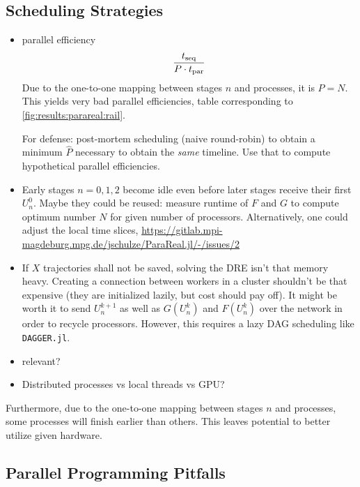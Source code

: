 \subsection{Scheduling Strategies}

\begin{itemize}
  \item
    parallel efficiency
    \begin{equation}
      \frac{t_\text{seq}}{P\cdot t_\text{par}}
    \end{equation}
    Due to the one-to-one mapping between stages $n$ and processes, it is $P = N$.
    This yields very bad parallel efficiencies, \cf table corresponding to \autoref{fig:results:parareal:rail}.

    For defense: post-mortem scheduling (\eg naive round-robin) to obtain a minimum $\hat P$ necessary to obtain the \emph{same} timeline.
    Use that to compute hypothetical parallel efficiencies.
  \item
    Early stages $n=0,1,2$ become idle even before later stages receive their first $U^0_n$.
    Maybe they could be reused: measure runtime of $F$ and $G$ to compute optimum number $N$ for given number of processors.
    Alternatively, one could adjust the local time slices, \cf \url{https://gitlab.mpi-magdeburg.mpg.de/jschulze/ParaReal.jl/-/issues/2}
  \item
    If $X$ trajectories shall not be saved, solving the \ac{DRE} isn't that memory heavy.
    Creating a connection between workers in a cluster shouldn't be that expensive (they are initialized lazily, but cost should pay off).
    It might be worth it to send $U^{k+1}_n$ as well as $G(U^k_n)$ and $F(U^k_n)$ over the network in order to recycle processors.
    However, this requires a lazy DAG scheduling like \texttt{DAGGER.jl}.
  \item
    \cite[493]{Nielsen2018} relevant?
  \item
    Distributed processes vs local threads vs GPU?
\end{itemize}

Furthermore, due to the one-to-one mapping between stages $n$ and processes,
some processes will finish earlier than others.
This leaves potential to better utilize given hardware.

\subsection{Parallel Programming Pitfalls}

